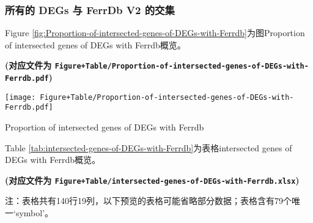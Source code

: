 \documentclass[
]{article}
\begin{document}
\hypertarget{ux6240ux6709ux7684-degs-ux4e0e-ferrdb-v2-ux7684ux4ea4ux96c6}{%
\subsubsection{所有的 DEGs 与 FerrDb V2 的交集}\label{ux6240ux6709ux7684-degs-ux4e0e-ferrdb-v2-ux7684ux4ea4ux96c6}}

Figure \ref{fig:Proportion-of-intersected-genes-of-DEGs-with-Ferrdb}为图Proportion of intersected genes of DEGs with Ferrdb概览。

\textbf{(对应文件为 \texttt{Figure+Table/Proportion-of-intersected-genes-of-DEGs-with-Ferrdb.pdf})}

\def\@captype{figure}
\begin{center}
\texttt{[image: Figure+Table/Proportion-of-intersected-genes-of-DEGs-with-Ferrdb.pdf]}
\caption{Proportion of intersected genes of DEGs with Ferrdb}\label{fig:Proportion-of-intersected-genes-of-DEGs-with-Ferrdb}
\end{center}

Table \ref{tab:intersected-genes-of-DEGs-with-Ferrdb}为表格intersected genes of DEGs with Ferrdb概览。

\textbf{(对应文件为 \texttt{Figure+Table/intersected-genes-of-DEGs-with-Ferrdb.xlsx})}

\begin{center}\begin{tcolorbox}[colback=gray!10, colframe=gray!50, width=0.9\linewidth, arc=1mm, boxrule=0.5pt]注：表格共有140行19列，以下预览的表格可能省略部分数据；表格含有79个唯一`symbol'。
\end{tcolorbox}
\end{center}
\end{document}
